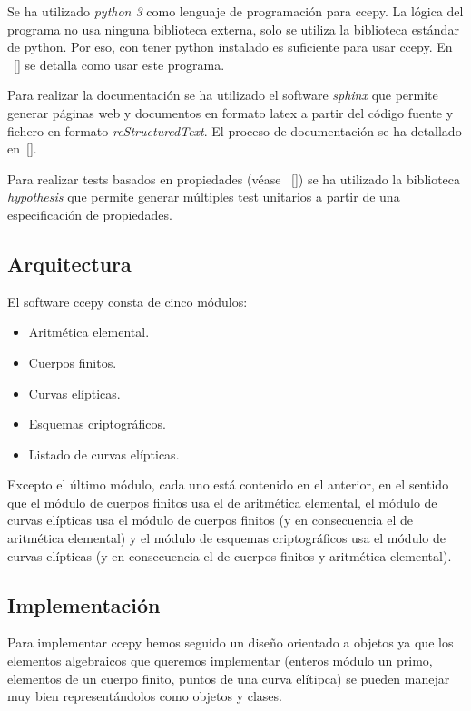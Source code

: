 Se ha utilizado \emph{python 3} como lenguaje de programación para ccepy. La lógica del programa no usa ninguna biblioteca externa, solo se utiliza la biblioteca estándar de python. Por eso, con tener python instalado es suficiente para usar ccepy. En ~\ref{} se detalla como usar este programa.

Para realizar la documentación se ha utilizado el software \emph{sphinx} que permite generar páginas web y documentos en formato latex a partir del código fuente y fichero en formato \emph{reStructuredText}. El proceso de documentación se ha detallado en~\ref{}.

Para realizar tests basados en propiedades (véase ~\ref{}) se ha utilizado la biblioteca \emph{hypothesis} que permite generar múltiples test unitarios a partir de una especificación de propiedades.

\subsection{Arquitectura}
\label{sub:Arquitectura}

El software ccepy consta de cinco módulos:

\begin{itemize}
    \item Aritmética elemental.
    \item Cuerpos finitos.
    \item Curvas elípticas.
    \item Esquemas criptográficos.
    \item Listado de curvas elípticas.
\end{itemize}

Excepto el último módulo, cada uno está contenido en el anterior, en el sentido que el módulo de cuerpos finitos usa el de aritmética elemental, el módulo de curvas elípticas usa el módulo de cuerpos finitos (y en consecuencia el de aritmética elemental) y el módulo de esquemas criptográficos usa el módulo de curvas elípticas (y en consecuencia el de cuerpos finitos y aritmética elemental).

\subsection{Implementación}
\label{sub:Implementación}

Para implementar ccepy hemos seguido un diseño orientado a objetos ya que los elementos algebraicos que queremos implementar (enteros módulo un primo, elementos de un cuerpo finito, puntos de una curva elítipca) se pueden manejar muy bien representándolos como objetos y clases.

